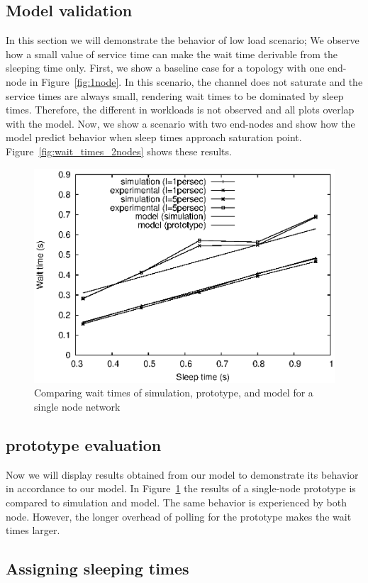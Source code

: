\subsection{Model validation}
In this section we will demonstrate the behavior of low load scenario; We observe how a small value of service time can make the wait time derivable from the sleeping time only. First, we show a baseline case for a topology with one end-node in Figure~\ref{fig:1node}. In this scenario, the channel does not saturate and the service times are always small, rendering wait times to be dominated by sleep times. Therefore, the different in workloads is not observed and all plots overlap with the model. Now, we show a scenario with two end-nodes and show how the model predict behavior when sleep times approach saturation point. Figure~\ref{fig:wait_times_2nodes} shows these results.

\begin{figure}[t]
\centering
\includegraphics[scale=0.65]{figures/1node_both.eps}
\caption{Comparing wait times of simulation, prototype, and model for a single node network}
\label{fig:1node_both}
\end{figure}

\subsection{prototype evaluation}
Now we will display results obtained from our model to demonstrate its behavior in accordance to our model. In Figure~\ref{fig:1node_both} the results of a single-node prototype is compared to simulation and model. The same behavior is experienced by both node. However, the longer overhead of polling for the prototype makes the wait times larger. 




\subsection{Assigning sleeping times}




